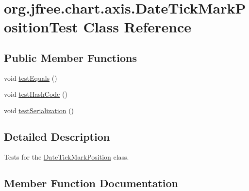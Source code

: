 \hypertarget{classorg_1_1jfree_1_1chart_1_1axis_1_1_date_tick_mark_position_test}{}\section{org.\+jfree.\+chart.\+axis.\+Date\+Tick\+Mark\+Position\+Test Class Reference}
\label{classorg_1_1jfree_1_1chart_1_1axis_1_1_date_tick_mark_position_test}
\subsection*{Public Member Functions}
\begin{DoxyCompactItemize}
\item 
void \mbox{\hyperlink{classorg_1_1jfree_1_1chart_1_1axis_1_1_date_tick_mark_position_test_acf2784e04867050f7e7eeba0b5013111}{test\+Equals}} ()
\item 
void \mbox{\hyperlink{classorg_1_1jfree_1_1chart_1_1axis_1_1_date_tick_mark_position_test_a034a4bd8667535a028abb70b555f6500}{test\+Hash\+Code}} ()
\item 
void \mbox{\hyperlink{classorg_1_1jfree_1_1chart_1_1axis_1_1_date_tick_mark_position_test_ac5c4e49d5c3d5abc9efb68bb46e2e18d}{test\+Serialization}} ()
\end{DoxyCompactItemize}


\subsection{Detailed Description}
Tests for the \mbox{\hyperlink{classorg_1_1jfree_1_1chart_1_1axis_1_1_date_tick_mark_position}{Date\+Tick\+Mark\+Position}} class. 

\subsection{Member Function Documentation}
\mbox{\label{classorg_1_1jfree_1_1chart_1_1axis_1_1_date_tick_mark_position_test_acf2784e04867050f7e7eeba0b5013111}} 
